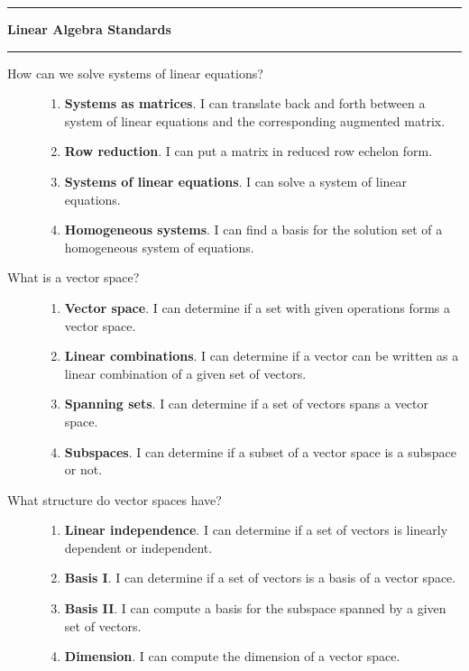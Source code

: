 \documentclass{article}
\begin{document}
\pagestyle{empty}
\noindent \course \hfill \sem \hfill \prof
\vspace{0.3in}
\hrule
\begin{center}{\large \bf Linear Algebra Standards}\end{center}
\hrule


\begin{description}
\item[How can we solve systems of linear equations?] \hfill
\begin{enumerate}
\item {\bf Systems as matrices}. I can translate back and forth between a system of linear equations and the corresponding augmented matrix.
\item {\bf Row reduction}.  I can put a matrix in reduced row echelon form.
\item {\bf Systems of linear equations}. I can solve a system of linear equations.
\item {\bf Homogeneous systems}. I can find a basis for the solution set of a homogeneous system of equations.
\end{enumerate}

\item[What is a vector space?] \hfill
\begin{enumerate}
\item {\bf Vector space}. I can determine if a set with given operations forms a vector space.
\item {\bf Linear combinations}. I can determine if a vector can be written as a linear combination of a given set of vectors.
\item {\bf Spanning sets}. I can determine if a set of vectors spans a vector space.
\item {\bf Subspaces}. I can determine if a subset of a vector space is a subspace or not.

\end{enumerate}

\item [What structure do vector spaces have?] \hfill
\begin{enumerate}

\item {\bf Linear independence}. I can determine if a set of vectors is linearly dependent or independent.
\item {\bf Basis I}. I can determine if a set of vectors is a basis of a vector space.
\item {\bf Basis II}.  I can compute a basis for the subspace spanned by a given set of vectors.
\item {\bf Dimension}.  I can compute the dimension of a vector space.
\end{enumerate}


\end{description}
\end{document}
